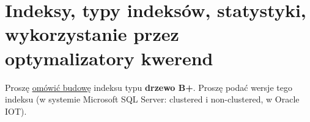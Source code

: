     \section{Indeksy, typy indeksów, statystyki, wykorzystanie przez
             optymalizatory kwerend} %
    \label{sec:indeksy}

    \horrule{0.5pt}
    Proszę \underline{omówić budowę} indeksu typu \textbf{drzewo B+}. Proszę
    podać wersje tego indeksu (w systemie Microsoft SQL Server: clustered i
    non-clustered, w Oracle IOT).\\
    \horrule{0.5pt}

\pagebreak

